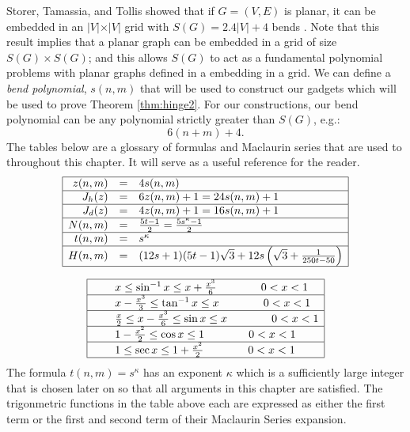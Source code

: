 Storer, Tamassia, and Tollis showed that if $G=(V,E)$ is planar, it can be embedded in an $\vert V \vert \times \vert V \vert$ grid with $S(G)=2.4\vert V\vert + 4$ bends \cite{storer1984minimal,tamassia1987efficient}.
Note that this result implies that a planar graph can be embedded in a grid of size $S(G) \times S(G)$; and this allows $S(G)$ to act as a fundamental polynomial problems with planar graphs defined in a embedding in a grid.
We can define a \textit{bend polynomial}, $s(n,m)$ that will be used to construct our gadgets which will be used to prove Theorem \ref{thm:hinge2}.
For our constructions, our bend polynomial can be any polynomial strictly greater than $S(G)$, e.g.:
$$6 (n+m) + 4.$$
The tables below are a glossary of formulas and Maclaurin series that are used to throughout this chapter.
It will serve as a useful reference for the reader.
$$
\begin{array}{|rcl|}
\hline
z(n,m)		&=& 4 s(n,m)\\\hline
J_h (z) 	&=& 6z(n,m)+1 = 24s(n,m)+1 \\\hline
J_d (z) 	&=& 4z(n,m)+1												= 16s(n,m)+1  			\\\hline
N(n,m)		&=& \frac{5t-1}{2}											= \frac{5s^\kappa-1}{2}	\\\hline
t(n,m)		&=& s^\kappa																		\\\hline
H(n,m) 		&=&  (12s+1)  (5t-1)  \sqrt{3} + 12s \left( \sqrt{3}+ \frac{1}{250t-50} \right)				\\\hline
\end{array}
$$


$$
\begin{array}{|rcl|}
\hline
&& x 				\leq \sin^{-1} x \leq x + \frac{x^3}{6} \qquad\qquad 0< x <1 \\\hline
&& x - \frac{x^3}{3}\leq \tan^{-1} x \leq x 				\qquad\qquad 0< x < 1\\\hline
&& \frac{x}{2}\leq x - \frac{x^3}{6}\leq \sin x 	 \leq x 				\qquad\qquad 0< x < 1\\\hline
&& 1 - \frac{x^2}{2}\leq \cos x 	 \leq 1 				\qquad\qquad 0< x < 1\\\hline
&& 1 				\leq \sec x 	 \leq 1 + \frac{x^2}{2} \qquad\qquad 0< x < 1\\\hline
\end{array}
$$
The formula $t(n,m)=s^\kappa$ has an exponent $\kappa$ which is a sufficiently large integer that is chosen later on so that all arguments in this chapter are satisfied.
The trigonmetric functions in the table above each are expressed as either the first term or the first and second term of their Maclaurin Series expansion.

